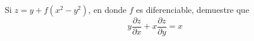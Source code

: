 \item Si $z = y + f(x^2 - y^2)$, en donde $f$ es diferenciable, demuestre que 
\[ y \frac{\partial z}{\partial x} + x \frac{\partial z}{\partial y} = x \]
